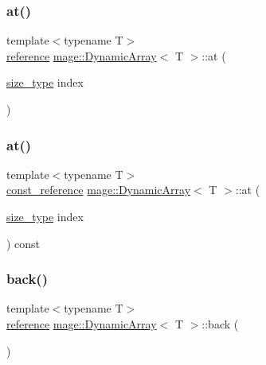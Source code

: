 \subsubsection{\texorpdfstring{at()}{at()}\hspace{0.1cm}{\footnotesize\ttfamily [1/2]}}
{\footnotesize\ttfamily template$<$typename T$>$ \\
\mbox{\hyperlink{classmage_1_1_dynamic_array_ac725ab843a578b8eb2e4499eca728149}{reference}} \mbox{\hyperlink{classmage_1_1_dynamic_array}{mage\+::\+Dynamic\+Array}}$<$ T $>$\+::at (\begin{DoxyParamCaption}\item[{\mbox{\hyperlink{classmage_1_1_dynamic_array_abae3236bcd8d1de414cbdf05219966b9}{size\+\_\+type}}}]{index }\end{DoxyParamCaption})}

\mbox{\label{classmage_1_1_dynamic_array_a236c420428994fbc7c92a74ef5db533e}} 
\subsubsection{\texorpdfstring{at()}{at()}\hspace{0.1cm}{\footnotesize\ttfamily [2/2]}}
{\footnotesize\ttfamily template$<$typename T$>$ \\
\mbox{\hyperlink{classmage_1_1_dynamic_array_ad2c044077223c0463e317649d4513dbc}{const\+\_\+reference}} \mbox{\hyperlink{classmage_1_1_dynamic_array}{mage\+::\+Dynamic\+Array}}$<$ T $>$\+::at (\begin{DoxyParamCaption}\item[{\mbox{\hyperlink{classmage_1_1_dynamic_array_abae3236bcd8d1de414cbdf05219966b9}{size\+\_\+type}}}]{index }\end{DoxyParamCaption}) const}

\mbox{\label{classmage_1_1_dynamic_array_ac304cb15d51ea63fe0f95d9bc1aef911}} 
\subsubsection{\texorpdfstring{back()}{back()}\hspace{0.1cm}{\footnotesize\ttfamily [1/2]}}
{\footnotesize\ttfamily template$<$typename T$>$ \\
\mbox{\hyperlink{classmage_1_1_dynamic_array_ac725ab843a578b8eb2e4499eca728149}{reference}} \mbox{\hyperlink{classmage_1_1_dynamic_array}{mage\+::\+Dynamic\+Array}}$<$ T $>$\+::back (\begin{DoxyParamCaption}{ }\end{DoxyParamCaption})\hspace{0.3cm}{\ttfamily [noexcept]}}

